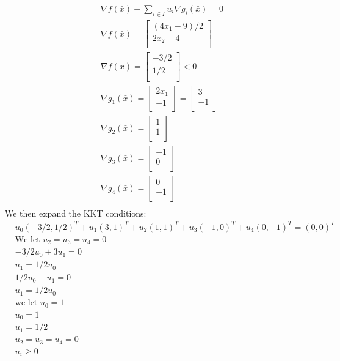 \documentclass[12pt]{article}
\begin{document}
    \begin{align*}
        &\nabla f(\bar x) + \sum_{i \in I} u_i \nabla g_i(\bar x) = 0\\
        &\nabla f(\bar x) = 
        \begin{bmatrix}
            (4x_1 - 9)/2\\
            2x_2 - 4\\
        \end{bmatrix}\\
        &\nabla f(\bar x) = 
         \begin{bmatrix}
            -3/2\\
            1/2\\
        \end{bmatrix} < 0 \\
        &\nabla g_1(\bar x) = 
         \begin{bmatrix}
            2x_1\\
            -1\\
        \end{bmatrix} = 
        \begin{bmatrix}
            3\\
            -1\\
        \end{bmatrix}\\
        &\nabla g_2(\bar x) = 
         \begin{bmatrix}
            1\\
            1\\
        \end{bmatrix}\\
        &\nabla g_3(\bar x) = 
         \begin{bmatrix}
            -1\\
            0\\
        \end{bmatrix}\\
        &\nabla g_4(\bar x) = 
         \begin{bmatrix}
            0\\
            -1\\
        \end{bmatrix}\\        
    \end{align*}
We then expand the KKT conditions: \\
    \begin{align*}
        &u_0 (-3/2 , 1/2)^T + u_1 (3, 1)^T + u_2 (1,1)^T + u_3(-1,0)^T + u_4(0,-1)^T = (0,0)^T\\
        &\text{We let } u_2=u_3 = u_4 = 0 \\
        &-3/2u_0 + 3u_1 = 0\\
        &u_1 = 1/2 u_0\\
        &1/2u_0 - u_1 = 0\\
        &u_1 = 1/2 u_0\\
        &\text{we let } u_0 = 1\\ 
        &u_0 = 1\\
        &u_1 = 1/2\\
        &u_2 = u_3 = u_4 = 0\\ 
        &u_i \geq 0
    \end{align*}
\end{document}
